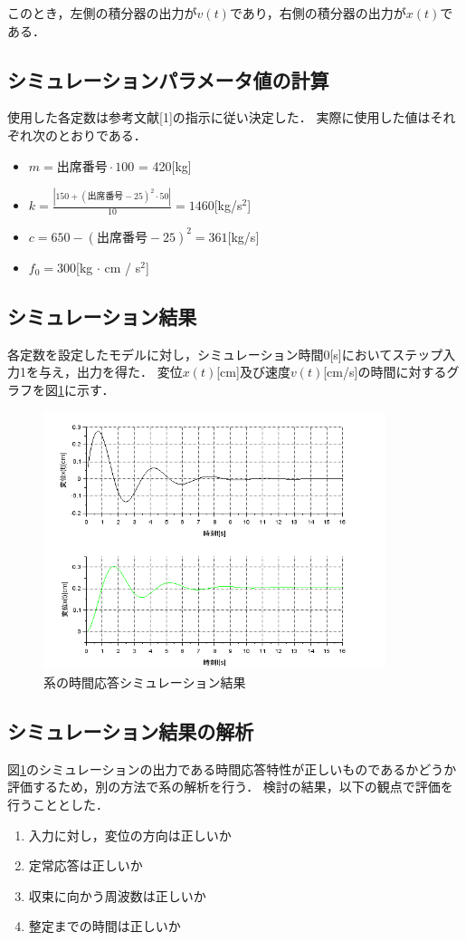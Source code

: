 \documentclass[dvipdfmx,titlepage,a4j]{jsarticle}  %
\begin{document}
このとき，左側の積分器の出力が$v(t)$であり，右側の積分器の出力が$x(t)$である．

\subsection{シミュレーションパラメータ値の計算}
使用した各定数は参考文献[1]の指示に従い決定した．
実際に使用した値はそれぞれ次のとおりである．
\begin{itemize}
  \item $m = 出席番号 \cdot 100$ = 420[kg]
  \item $k = \frac{|150 + (出席番号 - 25)^2 \cdot 50|}{10} = 1460$[kg/s$^2$]
  \item $c = 650 - (出席番号 - 25)^2 = 361$[kg/s]
  \item $f_0 = 300$[kg $\cdot$ cm / s$^2$]
\end{itemize}

\subsection{シミュレーション結果}
各定数を設定したモデルに対し，シミュレーション時間0[s]においてステップ入力1を与え，出力を得た．
変位$x(t)$[cm]及び速度$v(t)$[cm/s]の時間に対するグラフを図\ref{fig:bane-graph.png}に示す．

\begin{figure}[H]
  \centering
  \includegraphics[width=10cm]{../graph/bane-graph.png}
  \caption{系の時間応答シミュレーション結果}
  \label{fig:bane-graph.png}
\end{figure}

\subsection{シミュレーション結果の解析}
図\ref{fig:bane-graph.png}のシミュレーションの出力である時間応答特性が正しいものであるかどうか評価するため，別の方法で系の解析を行う．
検討の結果，以下の観点で評価を行うこととした．
\begin{enumerate}
  \item 入力に対し，変位の方向は正しいか
  \item 定常応答は正しいか
  \item 収束に向かう周波数は正しいか
  \item 整定までの時間は正しいか
\end{enumerate}
\end{document}
